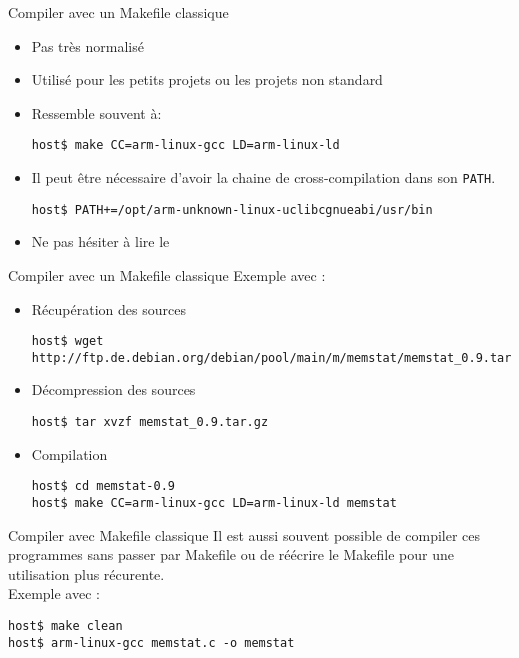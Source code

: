\begin{frame}[fragile=singleslide]{Compiler avec un Makefile classique}
  \begin{itemize}
  \item Pas très normalisé
  \item Utilisé pour les petits projets ou les projets non standard
  \item Ressemble souvent à:
\begin{lstlisting}
host$ make CC=arm-linux-gcc LD=arm-linux-ld 
\end{lstlisting} %
  \item Il peut être nécessaire d'avoir la chaine de cross-compilation
    dans son \verb+PATH+.
\begin{lstlisting}
host$ PATH+=/opt/arm-unknown-linux-uclibcgnueabi/usr/bin
\end{lstlisting} %
  \item Ne pas hésiter à lire le 
  \end{itemize}
\end{frame}

\begin{frame}[fragile=singleslide]{Compiler avec un Makefile classique}
  Exemple avec :
  \begin{itemize}
  \item Récupération des sources
\begin{lstlisting}
host$ wget http://ftp.de.debian.org/debian/pool/main/m/memstat/memstat_0.9.tar.gz
\end{lstlisting}
  \item Décompression des sources
\begin{lstlisting}
host$ tar xvzf memstat_0.9.tar.gz
\end{lstlisting}
  \item Compilation
\begin{lstlisting}
host$ cd memstat-0.9
host$ make CC=arm-linux-gcc LD=arm-linux-ld memstat
\end{lstlisting} %
  \end{itemize}
\end{frame}

\begin{frame}[fragile=singleslide]{Compiler avec Makefile classique}
  Il est aussi souvent possible de compiler ces programmes sans passer
  par Makefile  ou de réécrire  le Makefile pour une  utilisation plus
  récurente.\\[2ex]
  Exemple avec :
\begin{lstlisting}
host$ make clean
host$ arm-linux-gcc memstat.c -o memstat
\end{lstlisting} %
\end{frame}

